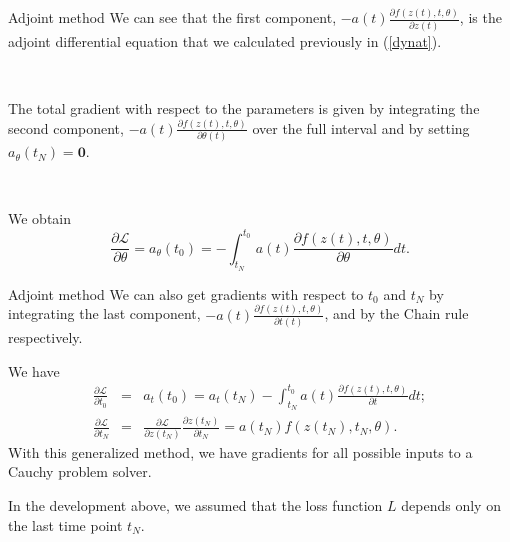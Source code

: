 \documentclass[11pt]{beamer}
\begin{document}
\begin{frame}{Adjoint method}
We can see that the first component, $-a(t)\frac{\partial f(z(t),t,\theta)}{\partial z(t)}$, is the adjoint differential equation that we calculated previously in (\ref{dynat}). 

~

The total gradient with respect to the parameters is given by integrating the second component, $-a(t)\frac{\partial f(z(t),t,\theta)}{\partial \theta(t)}$ over the full interval and by setting $a_\theta (t_N) = \textbf{0}$. 

~

We obtain 
\begin{equation*}
\frac{\partial \mathcal{L}}{\partial \theta} = a_\theta (t_0) = - \int_{t_N}^{t_0} a(t) \frac{\partial f(z(t),t,\theta)}{\partial \theta} dt.
\end{equation*}
\end{frame}

\begin{frame}{Adjoint method}
We can also get gradients with respect to $t_0$ and $t_N$ by integrating the last component, $-a(t)\frac{\partial f(z(t),t,\theta)}{\partial t(t)}$, and by the Chain rule respectively. 

We have
\begin{eqnarray*}
\frac{\partial \mathcal{L}}{\partial t_0} &=& a_t(t_0) = a_t(t_N) - \int_{t_N}^{t_0} a(t) \frac{\partial f(z(t),t,\theta)}{\partial t} dt ; \\
\frac{\partial \mathcal{L}}{\partial t_N} &=& \frac{\partial \mathcal{L}}{\partial z(t_N)} \frac{\partial z(t_N)}{\partial t_N} = a(t_N)f(z(t_N),t_N,\theta).
\end{eqnarray*}
With this generalized method, we have gradients for all possible inputs to a Cauchy problem solver. 

In the development above, we assumed that the loss function $L$ depends only on the last time point $t_N$.
\end{frame}
\end{document}
